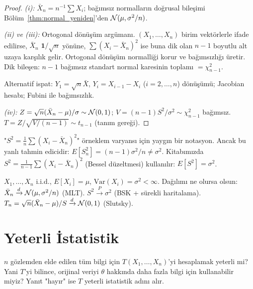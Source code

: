 \begin{proof}
\textit{(i):} $\bar{X}_n = n^{-1}\sum X_i$; bağımsız normalların doğrusal bileşimi
Bölüm~\ref{thm:normal_yeniden}'den $\mathcal{N}(\mu, \sigma^2/n)$.

\textit{(ii) ve (iii):} Ortogonal dönüşüm argümanı.
$(X_1,\ldots,X_n)$ birim vektörlerle ifade edilirse, $\bar{X}_n$
$\mathbf{1}/\sqrt{n}$ yönüne, $\sum(X_i-\bar{X}_n)^2$ ise buna dik olan $n-1$ boyutlu
alt uzaya karşılık gelir. Ortogonal dönüşüm normalliği korur ve bağımsızlığı üretir.
Dik bileşen: $n-1$ bağımsız standart normal karesinin toplamı $= \chi^2_{n-1}$.

Alternatif ispat: $Y_1 = \sqrt{n}\bar{X}$, $Y_i = X_{i-1}-X_i$ ($i=2,\ldots,n$) dönüşümü;
Jacobian hesabı; Fubini ile bağımsızlık.

\textit{(iv):} $Z = \sqrt{n}(\bar{X}_n-\mu)/\sigma \sim \mathcal{N}(0,1)$;
$V = (n-1)S^2/\sigma^2 \sim \chi^2_{n-1}$ bağımsız.
$T = Z/\sqrt{V/(n-1)} \sim t_{n-1}$ (tanım gereği).
\end{proof}

\begin{hataanalizi}
"$S^2 = \frac{1}{n}\sum(X_i-\bar{X}_n)^2$" örneklem varyansı için yaygın bir notasyon.
Ancak bu yanlı tahmin edicidir: $E[S_n^2] = (n-1)\sigma^2/n \neq \sigma^2$.
Kitabımızda $S^2 = \frac{1}{n-1}\sum(X_i-\bar{X}_n)^2$ (Bessel düzeltmesi) kullanılır:
$E[S^2] = \sigma^2$.
\end{hataanalizi}

\begin{teorem}
\label{thm:buyuk_orneklem_dagilim}
$X_1,\ldots,X_n$ i.i.d., $E[X_i]=\mu$, $\mathrm{Var}(X_i)=\sigma^2<\infty$.
Dağılımı ne olursa olsun: $\bar{X}_n \xrightarrow{d} \mathcal{N}(\mu, \sigma^2/n)$ (MLT).
$S^2 \xrightarrow{P} \sigma^2$ (BSK + sürekli haritalama).
$T_n = \sqrt{n}(\bar{X}_n-\mu)/S \xrightarrow{d} \mathcal{N}(0,1)$ (Slutsky).
\end{teorem}

\section{Yeterli İstatistik}
\label{sec:yeterli_istatistik}

\begin{kesif}
$n$ gözlemden elde edilen tüm bilgi için $T(X_1,\ldots,X_n)$'yi hesaplamak yeterli mi?
Yani $T$'yi bilince, orijinal veriyi $\theta$ hakkında daha fazla bilgi için kullanabilir miyiz?
Yanıt "hayır" ise $T$ yeterli istatistik adını alır.
\end{kesif}

